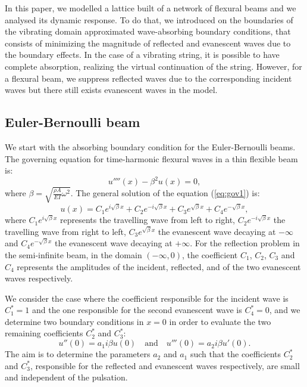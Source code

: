 \documentclass[11pt]{article}
\begin{document}
In this paper, we modelled a lattice built of a network of flexural beams and we analysed its dynamic response. To do that, we introduced on the boundaries of the vibrating domain approximated wave-absorbing boundary conditions, that consists of minimizing the magnitude of reflected and evanescent waves due to the boundary effects. In the case of a vibrating string, it is possible to have complete absorption, realizing the virtual continuation of the string. However, for a flexural beam, we suppress reflected waves due to the corresponding incident waves but there still exists evanescent waves in the model.

\subsection{Euler-Bernoulli beam}

We start with the absorbing boundary condition for the Euler-Bernoulli beams. The governing equation for time-harmonic flexural waves in a thin flexible beam is:
%
\begin{equation}
\label{eq:gov1}
u''''(x)-\beta^2 u(x) = 0,
\end{equation}
%
where $\beta=\sqrt{\frac{\rho A}{E I}\omega^2}$. The general solution of the equation (\ref{eq:gov1}) is:
%
\begin{equation}
\label{eq:gov3}
u(x)=C_1e^{i\sqrt{\beta} x}+C_2e^{-i\sqrt{\beta} x}+C_3e^{\sqrt{\beta} x}+C_4e^{-\sqrt{\beta} x},
\end{equation}
%
where $C_1e^{i\sqrt{\beta} x}$ represents the travelling wave from left to right, $C_2e^{-i\sqrt{\beta} x}$ the travelling wave from right to left, $C_3e^{\sqrt{\beta} x}$ the evanescent wave decaying at $-\infty$ and $C_4e^{-\sqrt{\beta} x}$ the evanescent wave decaying at $+\infty$. For the reflection problem in the semi-infinite beam, in the domain $(-\infty,0)$, the coefficient $C_1$, $C_2$, $C_3$ and $C_4$ represents the amplitudes of the incident, reflected, and of the two evanescent waves respectively.

We consider the case where the coefficient responsible for the incident wave is $C_1^*=1$ and the one responsible for the second evanescent wave is $C_4^*=0$, and we determine two boundary conditions in $x=0$ in order to evaluate the two remaining coefficients $C_2^*$ and $C_3^*$:
%
\begin{equation}
\label{eq:gov4}
u''(0)=a_1 i \beta u(0) \quad \textrm{and} \quad u'''(0)=a_2 i \beta u'(0).
\end{equation}
%
The aim is to determine the parameters $a_2$ and $a_1$ such that the coefficients $C_2^*$ and $C_3^*$, responsible for the reflected and evanescent waves respectively, are small and independent of the pulsation. 
\end{document}
